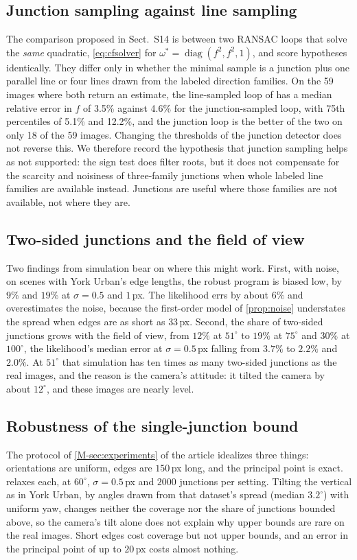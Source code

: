 \subsection{Junction sampling against line sampling}\label{sec:Ssampling}
 The comparison proposed in Sect.~S14 is between two RANSAC loops that solve the \emph{same} quadratic, \eqref{eq:cfsolver} for $\omega^{*}=\operatorname{diag}(f^2,f^2,1)$, and score hypotheses identically. They differ only in whether the minimal sample is a junction plus one parallel line or four lines drawn from the labeled direction families. On the 59 images where both return an estimate, the line-sampled loop of \citet{wildenauer2012} has a median relative error in $f$ of 3.5\% against 4.6\% for the junction-sampled loop, with 75th percentiles of 5.1\% and 12.2\%, and the junction loop is the better of the two on only 18 of the 59 images. Changing the thresholds of the junction detector does not reverse this. We therefore record the hypothesis that junction sampling helps as not supported: the sign test does filter roots, but it does not compensate for the scarcity and noisiness of three-family junctions when whole labeled line families are available instead. Junctions are useful where those families are not available, not where they are.

\subsection{Two-sided junctions and the field of view}
Two findings from simulation bear on where this might work. First, with noise, on scenes with York Urban's edge lengths, the robust program is biased low, by $9\%$ and $19\%$ at $\sigma=0.5$ and $1$\,px. The likelihood errs by about $6\%$ and overestimates the noise, because the first-order model of \cref{prop:noise} understates the spread when edges are as short as $33$\,px. Second, the share of two-sided junctions grows with the field of view, from $12\%$ at $51^\circ$ to $19\%$ at $75^\circ$ and $30\%$ at $100^\circ$, the likelihood's median error at $\sigma=0.5$\,px falling from $3.7\%$ to $2.2\%$ and $2.0\%$. At $51^\circ$ that simulation has ten times as many two-sided junctions as the real images, and the reason is the camera's attitude: it tilted the camera by about $12^\circ$, and these images are nearly level.

\subsection{Robustness of the single-junction bound}\label{sec:Srobust}
The protocol of \cref{M-sec:experiments} of the article idealizes three things: orientations are uniform, edges are $150$\,px long, and the principal point is exact.  relaxes each, at $60^\circ$, $\sigma=0.5$\,px and $2000$ junctions per setting. Tilting the vertical as in York Urban, by angles drawn from that dataset's spread (median $3.2^\circ$) with uniform yaw, changes neither the coverage nor the share of junctions bounded above, so the camera's tilt alone does not explain why upper bounds are rare on the real images. Short edges cost coverage but not upper bounds, and an error in the principal point of up to $20$\,px costs almost nothing.

